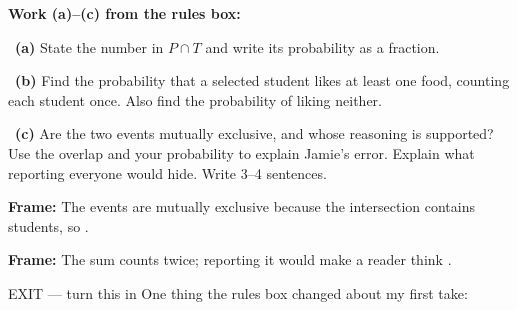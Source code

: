 \documentclass[11pt]{article}
\begin{document}
\newpage
\textbf{Work (a)--(c) from the rules box:}\par\smallskip

~\textbf{(a)} State the number in $P\cap T$ and write its probability as a fraction.\par
\workspace{0.7in}

~\textbf{(b)} Find the probability that a selected student likes at least one food, counting each student once. Also find the probability of liking neither.\par
\workspace{1.3in}

~\textbf{(c)} Are the two events mutually exclusive, and whose reasoning is supported? Use the overlap and your probability to explain Jamie's error. Explain what reporting everyone would hide. Write 3--4 sentences.\par
\workspace{2.0in}

\begin{sentenceframebox}\raggedright\textbf{Frame:} The events are \blank[1.0in] mutually exclusive because the intersection contains \blank[0.6in] students, so \blank[2.0in].\end{sentenceframebox}

\begin{sentenceframebox}\raggedright\textbf{Frame:} The sum \blank[1.0in] counts \blank[2.5in] twice; reporting it would make a reader think \blank[2.4in].\end{sentenceframebox}

\begin{summaryexitbox}{EXIT --- turn this in}
One thing the rules box changed about my first take: \hrulefill\par
\workspace{0.4in}
\end{summaryexitbox}
\end{document}
